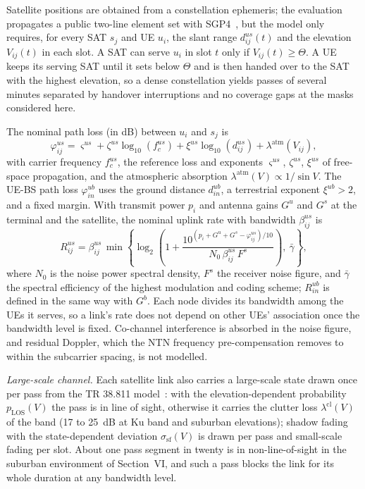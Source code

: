 Satellite positions are obtained from a constellation ephemeris; the evaluation propagates a public two-line element
set with SGP4~\cite{Vallado2006}, but the model only requires, for every SAT $s_j$ and UE $u_i$, the slant range
$d^{us}_{ij}(t)$ and the elevation $V_{ij}(t)$ in each slot. A SAT can serve $u_i$ in slot $t$ only if
$V_{ij}(t)\geq\Theta$. A UE keeps its serving SAT until it sets below $\Theta$ and is then handed over to the SAT
with the highest elevation, so a dense constellation yields passes of several minutes separated by handover
interruptions and no coverage gaps at the masks considered here.

The nominal path loss (in dB) between $u_i$ and $s_j$ is
\begin{equation}
    \varphi^{us}_{ij}=\varsigma^{us}+\zeta^{us}\log_{10}\!\left(f_{c}^{us}\right)
    +\xi^{us}\log_{10}\!\left(d^{us}_{ij}\right)+\lambda^{\mathrm{atm}}(V_{ij}),
\end{equation}
with carrier frequency $f_c^{us}$, the reference loss and exponents $\varsigma^{us}$, $\zeta^{us}$, $\xi^{us}$ of
free-space propagation, and the atmospheric absorption $\lambda^{\mathrm{atm}}(V)\propto 1/\sin V$. The UE-BS path
loss $\varphi^{ub}_{in}$ uses the ground distance $d^{ub}_{in}$, a terrestrial exponent $\xi^{ub}>2$, and a fixed
margin. With transmit power $p_i$ and antenna gains $G^{u}$ and $G^{s}$ at the terminal and the satellite, the nominal
uplink rate with bandwidth $\beta^{us}_{ij}$ is
\begin{equation}
    R^{us}_{ij}=\beta_{ij}^{us}\,\min\!\left\{\log_{2}\!\left(1+
    \frac{10^{(p_{i}+G^{u}+G^{s}-\varphi^{us}_{ij})/10}}{N_0\,\beta^{us}_{ij}\,F^{s}}\right),\ \bar{\gamma}\right\},
    \label{eq:rate_us}
\end{equation}
where $N_0$ is the noise power spectral density, $F^{s}$ the receiver noise figure, and $\bar\gamma$ the spectral
efficiency of the highest modulation and coding scheme; $R^{ub}_{in}$ is defined in the same way with $G^{b}$. Each
node divides its bandwidth among the UEs it serves, so a link's rate does not depend on other UEs' association once
the bandwidth level is fixed. Co-channel interference is absorbed in the noise figure, and residual Doppler, which
the NTN frequency pre-compensation removes to within the subcarrier spacing, is not modelled.

\emph{Large-scale channel.} Each satellite link also carries a large-scale state drawn once per pass from the
TR 38.811 model~\cite{TR38811}: with the elevation-dependent probability $p_{\mathrm{LOS}}(V)$ the pass is in line of
sight, otherwise it carries the clutter loss $\lambda^{\mathrm{cl}}(V)$ of the band (17 to 25~dB at Ku band and
suburban elevations); shadow fading with the state-dependent deviation $\sigma_{\mathrm{sf}}(V)$ is drawn per pass
and small-scale fading per slot. About one pass segment in twenty is in non-line-of-sight in the suburban environment
of Section~VI, and such a pass blocks the link for its whole duration at any bandwidth level.

